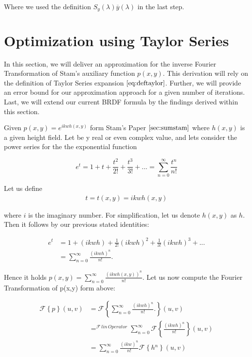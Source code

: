 Where we used the definition $S_y(\lambda)\overline{y}(\lambda)$ in the last step.

\section{Optimization using Taylor Series}
\label{sec:taylorapproximation}
In this section, we will deliver an approximation for the inverse Fourier Transformation of Stam's auxiliary function $p(x,y)$. This derivation will rely on the definition of Taylor Series expansion $\ref{eq:deftaylor}$. Further, we will provide an error bound for our approximation approach for a given number of iterations. Last, we will extend our current BRDF formula by the findings derived within this section.

Given $p(x,y)=e^{ikwh(x,y)}$ form Stam's Paper $\ref{sec:sumstam}$ where $h(x,y)$ is a given height field. Let be y real or even complex value, and lets consider the power series for the the exponential function
 
\begin{equation}
  e^{t}=1+t+\frac{t^{2}}{2!}+\frac{t^{3}}{3!}+...=\sum_{n=0}^{\infty}\frac{t^{n}}{n!}
\end{equation}

Let us define 
\begin{align}
t 
= t(x,y) 
= ikwh(x,y)
\end{align}
 
where $i$ is the imaginary number. For simplification, let us denote $h(x,y)$ as $h$. Then it follows by our previous stated identities: 

\begin{align}
 e^{t}
 &=1+(ikwh)+\frac{1}{2!}(ikwh)^{2}+\frac{1}{3!}(ikwh)^{3}+... \nonumber \\
 &=\sum_{n=0}^{\infty}\frac{(ikwh)^{n}}{n!}.
\end{align}

Hence it holds $p(x,y)=\sum_{n=0}^{\infty}\frac{(ikwh(x,y))^{n}}{n!}$. Let us now compute the Fourier Transformation of p(x,y) form above:

\begin{align}
  \mathcal{F}\left\{ p\right\}(u,v)
  & =\mathcal{F}\left\{ \sum_{n=0}^{\infty}\frac{(ikwh)^{n}}{n!}.\right\}(u,v) \nonumber \\
  & =^{\mathcal{F}\, lin\, Operator}\sum_{n=0}^{\infty}\mathcal{F}\left\{ \frac{(ikwh)^{n}}{n!}\right\}(u,v) \nonumber \\
  & =\sum_{n=0}^{\infty}\frac{(ikw)^{n}}{n!}\mathcal{F}\left\{ h{}^{n}\right\}(u,v)
\end{align}

